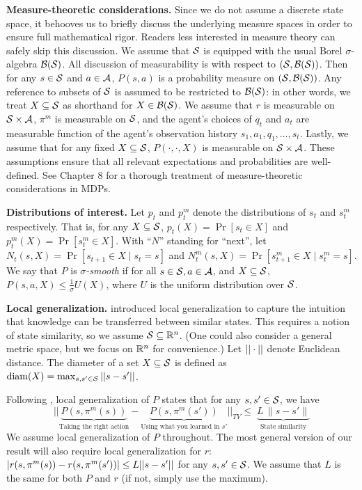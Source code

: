 \textbf{Measure-theoretic considerations.} Since we do not assume a discrete state space, it behooves us to briefly discuss the underlying measure spaces in order to ensure full mathematical rigor. Readers less interested in measure theory can safely skip this discussion. We assume that $\mathcal{S}$ is equipped with the usual Borel $\sigma$-algebra $\mathcal{B}(\mathcal{S})$. All discussion of measurability is with respect to $(\mathcal{S}, \mathcal{B}(\mathcal{S}))$. Then for any $s \in \mathcal{S}$ and $a \in \mathcal{A}$, $P(s,a)$ is a probability measure on $(\mathcal{S},\mathcal{B}(\mathcal{S}))$. Any reference to subsets of $\mathcal{S}$ is assumed to be restricted to $\mathcal{B}(\mathcal{S})$: in other words, we treat $X \subseteq \mathcal{S}$ as shorthand for $X \in \mathcal{B}(\mathcal{S})$. We assume that $r$ is measurable on $\mathcal{S} \times \mathcal{A}$, $\pi^m$ is measurable on $\mathcal{S}$, and the agent's choices of $q_t$ and $a_t$ are measurable function of the agent's observation history $s_1,a_1,q_1,\dots,s_t$. Lastly, we assume that for any fixed $X\subseteq \mathcal{S}$, $P(\cdot,\cdot,X)$ is measurable on $\mathcal{S}\times\mathcal{A}$. These assumptions ensure that all relevant expectations and probabilities are well-defined. See Chapter 8 \cite{bertsekas1996stochastic} for a thorough treatment of measure-theoretic considerations in MDPs.

\textbf{Distributions of interest.} Let $p_t$ and $p_t^m$ denote the distributions of $s_t$ and $s_t^m$ respectively. That is, for any $X \subseteq \mathcal{S}$, $p_t(X) = \Pr[s_t\in X]$ and $p_t^m(X)= \Pr[s_t^m \in X]$. With ``$N$'' standing for ``next'', let $N_t(s,X) = \Pr[s_{t+1} \in X \mid s_t = s]$ and $N_t^m(s,X) = \Pr[s_{t+1}^m \in X \mid s_t^m = s]$. We say that $P$ is \emph{$\sigma$-smooth} \cite{spielman2004smoothed, haghtalab2024smoothed} if for all $s \in \mathcal{S}, a \in \mathcal{A}$, and $X \subseteq \mathcal{S}$, $P(s,a,X) \le \frac{1}{\sigma}U(X)$, where $U$ is the uniform distribution over $\mathcal{S}$. 

\textbf{Local generalization.} \citet{plaut_avoiding_2024} introduced local generalization to capture the intuition that knowledge can be transferred between similar states. This requires a notion of state similarity, so we assume $\mathcal{S} \subseteq \mathbb{R}^n$. (One could also consider a general metric space, but we focus on $\mathbb{R}^n$ for convenience.) Let $||\cdot||$ denote Euclidean distance. The diameter of a set $X \subseteq \mathcal{S}$ is defined as $\operatorname*{diam}(X) = \max_{s, s' \in \mathcal{S}} ||s-s'||$.


Following \citet{plaut_avoiding_2024}, local generalization of $P$ states that for any $s,s' \in \mathcal{S}$, we have
\[
||\!\!\!
  \underbrace{P(s,\pi^m(s))}_{\text{Taking the right action}}\!
  -\!
  \underbrace{P(s,\pi^m(s'))}_{\text{Using what you learned in $s'$}} \!\!\!\!\!\!\!\!||_{TV}
\le\;
\underbrace{L \,\|s - s'\|}_{\text{State similarity}}
\]
We assume local generalization of $P$ throughout. The most general version of our result will also require local generalization for $r$:  $|r(s,\pi^m(s)) - r(s,\pi^m(s'))| \le L||s-s'||$ for any $s,s' \in \mathcal{S}$. We assume that $L$ is the same for both $P$ and $r$ (if not, simply use the maximum).

